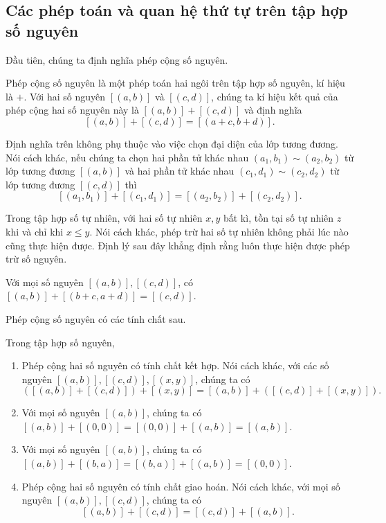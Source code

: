 \subsection{Các phép toán và quan hệ thứ tự trên tập hợp số nguyên}

Đầu tiên, chúng ta định nghĩa phép cộng số nguyên.
\begin{definition}
    Phép cộng số nguyên là một phép toán hai ngôi trên tập hợp số nguyên, kí hiệu là $+$. Với hai số nguyên $[(a, b)]$ và $[(c, d)]$, chúng ta kí hiệu kết quả của phép cộng hai số nguyên này là $[(a, b)] + [(c, d)]$ và định nghĩa
    \[
        [(a, b)] + [(c, d)] = [(a+c, b+d)].
    \]
\end{definition}

Định nghĩa trên không phụ thuộc vào việc chọn đại diện của lớp tương đương. Nói cách khác, nếu chúng ta chọn hai phần tử khác nhau $(a_{1}, b_{1}) \sim (a_{2}, b_{2})$ từ lớp tương đương $[(a, b)]$ và  hai phần tử khác nhau $(c_{1}, d_{1}) \sim (c_{2}, d_{2})$ từ lớp tương đương $[(c, d)]$ thì
\[
    [(a_{1}, b_{1})] + [(c_{1}, d_{1})] = [(a_{2}, b_{2})] + [(c_{2}, d_{2})].
\]

Trong tập hợp số tự nhiên, với hai số tự nhiên $x, y$ bất kì, tồn tại số tự nhiên $z$ khi và chỉ khi $x\leq y$. Nói cách khác, phép trừ hai số tự nhiên không phải lúc nào cũng thực hiện được. Định lý sau đây khẳng định rằng luôn thực hiện được phép trừ số nguyên.
\begin{theorem}
    Với mọi số nguyên $[(a, b)], [(c, d)]$, có $[(a, b)] + [(b+c, a+d)] = [(c, d)]$.
\end{theorem}

Phép cộng số nguyên có các tính chất sau.
\begin{theorem}\label{theorem:group-of-integers}
    Trong tập hợp số nguyên,
    \begin{enumerate}[label={(\roman*)}]
        \item Phép cộng hai số nguyên có tính chất kết hợp. Nói cách khác, với các số nguyên $[(a, b)], [(c, d)], [(x, y)]$, chúng ta có
              \[
                  ([(a, b)] + [(c, d)]) + [(x, y)] = [(a, b)] + ([(c, d)] + [(x, y)]).
              \]
        \item Với mọi số nguyên $[(a, b)]$, chúng ta có $[(a, b)] + [(0, 0)] = [(0, 0)] + [(a, b)] = [(a, b)]$.
        \item Với mọi số nguyên $[(a, b)]$, chúng ta có $[(a, b)] + [(b, a)] = [(b, a)] + [(a, b)] = [(0, 0)]$.
        \item Phép cộng hai số nguyên có tính chất giao hoán. Nói cách khác, với mọi số nguyên $[(a, b)], [(c, d)]$, chúng ta có
              \[
                  [(a, b)] + [(c, d)] = [(c, d)] + [(a, b)].
              \]
    \end{enumerate}
\end{theorem}

